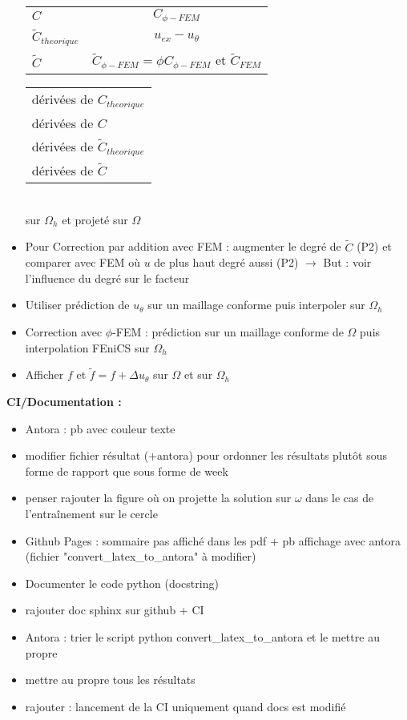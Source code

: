 \begin{itemize}[label=$\square$]
\begin{minipage}{0.48\linewidth}
\begin{tabular}[\linewidth]{lc}
			$C$ & $C_{\phi-FEM}$ \\
			$\tilde{C}_{theorique}$ & $u_{ex}-u_\theta$ \\
			$\tilde{C}$ & $\tilde{C}_{\phi-FEM}=\phi C_{\phi-FEM}$ et $\tilde{C}_{FEM}$
		\end{tabular}
	\end{minipage}
	\begin{minipage}{0.48\linewidth}
		\begin{tabular}[\linewidth]{l}
			dérivées de $C_{theorique}$ \\
			dérivées de $C$ \\
			dérivées de $\tilde{C}_{theorique}$ \\
			dérivées de $\tilde{C}$
		\end{tabular}
	\end{minipage} \\
	sur $\Omega_h$ et projeté sur $\Omega$
	\item[\previous{7}] Pour Correction par addition avec FEM : augmenter le degré de $\tilde{C}$ (P2) et comparer avec FEM où $u$ de plus haut degré aussi (P2) $\rightarrow$ But : voir l'influence du degré sur le facteur
	\item[\previous{7}] Utiliser prédiction de $u_\theta$ sur un maillage conforme puis interpoler sur $\Omega_h$
	\item[\previous{7}] Correction avec $\phi$-FEM : prédiction sur un maillage conforme de $\Omega$ puis interpolation FEniCS sur $\Omega_h$
	\item[\previous{7}] Afficher $f$ et $\tilde{f}=f+\Delta u_\theta$ sur $\Omega$ et sur $\Omega_h$
\end{itemize}
\textbf{CI/Documentation :}
\begin{itemize}[label=$\square$] 
	\item[\previous{6}] Antora : pb avec couleur texte
	\item[\previous{7}] modifier fichier résultat (+antora) pour ordonner les résultats plutôt sous forme de rapport que sous forme de week
	\item[\previous{7}] penser rajouter la figure où on projette la solution sur $\omega$ dans le cas de l'entraînement sur le cercle
	\item[\previous{8}] Github Pages : sommaire pas affiché dans les pdf + pb affichage avec antora (fichier "convert\_latex\_to\_antora" à modifier)
	\item[\previous{8}] Documenter le code python (docstring)
	\item[\previous{8}] rajouter doc sphinx sur github + CI
	\item[\previous{8}] Antora : trier le script python convert\_latex\_to\_antora et le mettre au propre
	\item[\previous{8}] mettre au propre tous les résultats 
	\item[\previous{8}] rajouter : lancement de la CI uniquement quand docs est modifié
\end{itemize}
